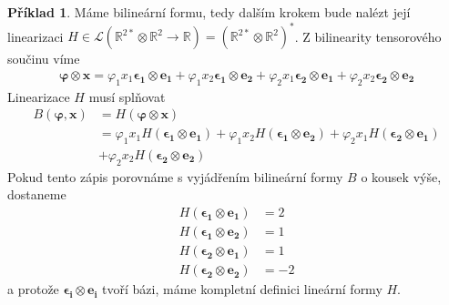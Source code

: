 \documentclass[a5paper,12pt]{amsbook}
\theoremstyle{definition}
\newtheorem{example}{Příklad}[chapter]
\newcommand{\myvec}[1]{\mathbf{#1}}
\newcommand{\myspace}[1]{\mathbb{#1}}
\begin{document}
\begin{example}
Máme bilineární formu, tedy dalším krokem bude nalézt její linearizaci
$H\in\mathcal{L}(\myspace{R}^{2*}\otimes\myspace{R}^2\rightarrow\myspace{R}) 
 = (\myspace{R}^{2*}\otimes\myspace{R}^2)^*$. Z bilinearity tensorového součinu víme
\begin{equation*}
\begin{split}
\myvec{\varphi}\otimes\myvec{x} = \varphi_1 x_1\myvec{\epsilon_1}\otimes\myvec{e_1}
 + \varphi_1 x_2\myvec{\epsilon_1}\otimes\myvec{e_2}
 + \varphi_2 x_1\myvec{\epsilon_2}\otimes\myvec{e_1}
 + \varphi_2 x_2\myvec{\epsilon_2}\otimes\myvec{e_2}
\end{split}
\end{equation*}
Linearizace $H$ musí splňovat
\begin{equation*}
\begin{split}
B(\myvec{\varphi}, \myvec{x}) &= H(\myvec{\varphi}\otimes\myvec{x}) \\
  &= \varphi_1 x_1 H(\myvec{\epsilon_1}\otimes\myvec{e_1})
    + \varphi_1 x_2 H(\myvec{\epsilon_1}\otimes\myvec{e_2})
    + \varphi_2 x_1 H(\myvec{\epsilon_2}\otimes\myvec{e_1}) \\
    &+ \varphi_2 x_2 H(\myvec{\epsilon_2}\otimes\myvec{e_2})
\end{split}
\end{equation*}
Pokud tento zápis porovnáme s vyjádřením bilineární formy $B$ o kousek výše, dostaneme
\begin{equation*}
\begin{split}
H(\myvec{\epsilon_1}\otimes\myvec{e_1}) &= 2 \\
H(\myvec{\epsilon_1}\otimes\myvec{e_2}) &= 1 \\
H(\myvec{\epsilon_2}\otimes\myvec{e_1}) &= 1 \\
H(\myvec{\epsilon_2}\otimes\myvec{e_2}) &= -2
\end{split}
\end{equation*}
a protože $\myvec{\epsilon_i}\otimes\myvec{e_i}$ tvoří bázi, máme kompletní definici
lineární formy $H$.


\end{example}
\end{document}

